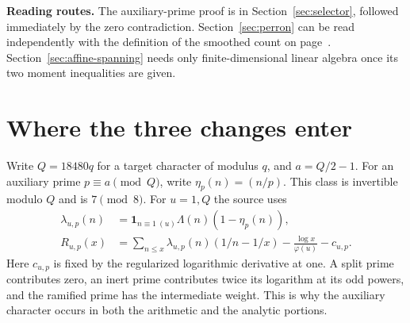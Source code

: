 \documentclass[11pt,letterpaper]{article}
\begin{document}
\textbf{Reading routes.} The auxiliary-prime proof is in Section~\ref{sec:selector}, followed immediately by the zero contradiction. Section~\ref{sec:perron} can be read independently with the definition of the smoothed count on page~\pageref{sec:setup}. Section~\ref{sec:affine-spanning} needs only finite-dimensional linear algebra once its two moment inequalities are given.

\clearpage
\section{Where the three changes enter}\label{sec:setup}
Write $Q=18480q$ for a target character of modulus $q$, and $a=Q/2-1$. For an auxiliary prime $p\equiv a\pmod Q$, write $\eta_p(n)=(n/p)$. This class is invertible modulo $Q$ and is $7\pmod8$. For $u=1,Q$ the source uses
\begin{align}
 \lambda_{u,p}(n)&=\mathbf1_{n\equiv1\ (u)}\Lambda(n)(1-\eta_p(n)),\nonumber\\
 R_{u,p}(x)&=\sum_{n\le x}\lambda_{u,p}(n)(1/n-1/x)
                       -\frac{\log x}{\varphi(u)}-c_{u,p}.\label{eq:R}
\end{align}
Here $c_{u,p}$ is fixed by the regularized logarithmic derivative at one. A split prime contributes zero, an inert prime contributes twice its logarithm at its odd powers, and the ramified prime has the intermediate weight. This is why the auxiliary character occurs in both the arithmetic and the analytic portions.
\end{document}
